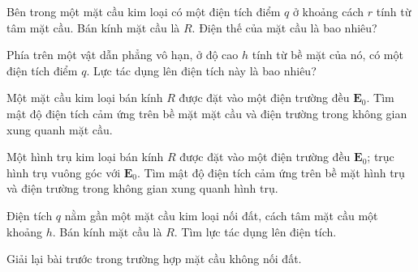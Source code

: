  Bên trong một mặt cầu kim loại có một điện tích điểm $q$ ở khoảng cách $r$ tính từ tâm mặt cầu. Bán kính mặt cầu là $R$. Điện thế của mặt cầu là bao nhiêu?


 Phía trên một vật dẫn phẳng vô hạn, ở độ cao $h$ tính từ bề mặt của nó, có một điện tích điểm $q$. Lực tác dụng lên điện tích này là bao nhiêu?


 Một mặt cầu kim loại bán kính $R$ được đặt vào một điện trường đều $\mathbf{E}_0$. Tìm mật độ điện tích cảm ứng trên bề mặt mặt cầu và điện trường trong không gian xung quanh mặt cầu. 


 Một hình trụ kim loại bán kính $R$ được đặt vào một điện trường đều $\mathbf{E}_0$; trục hình trụ vuông góc với $\mathbf{E}_0$. Tìm mật độ điện tích cảm ứng trên bề mặt hình trụ và điện trường trong không gian xung quanh hình trụ. 

\dapso{
\[
E_r = \left(\frac{R^2}{r^2}+1\right)E_0\cos\theta, \qquad E_\theta = \left(\frac{R^2}{r^2}-1\right)E_0\sin\theta, \qquad \sigma(\theta)=2\varepsilon_0 E_0\cos\theta.
\]}

 Điện tích $q$ nằm gần một mặt cầu kim loại nối đất, cách tâm mặt cầu một khoảng $h$. Bán kính mặt cầu là $R$. Tìm lực tác dụng lên điện tích.


 Giải lại bài trước trong trường hợp mặt cầu không nối đất. 

